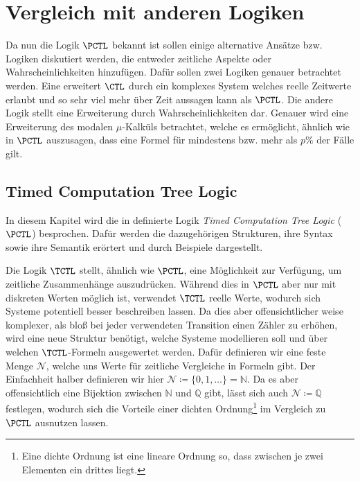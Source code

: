 \section{Vergleich mit anderen Logiken}
\label{ChapVerwandt}

Da nun die Logik $\PCTL$ bekannt ist sollen einige alternative Ansätze bzw. Logiken diskutiert werden, die entweder zeitliche Aspekte oder Wahrscheinlichkeiten hinzufügen.
Dafür sollen zwei Logiken genauer betrachtet werden.
Eine erweitert $\CTL$ durch ein komplexes System welches reelle Zeitwerte erlaubt und so sehr viel mehr über Zeit aussagen kann als $\PCTL$.
Die andere Logik stellt eine Erweiterung durch Wahrscheinlichkeiten dar.
Genauer wird eine Erweiterung des modalen $\mu$-Kalküls betrachtet, welche es ermöglicht, ähnlich wie in $\PCTL$ auszusagen, dass eine Formel für mindestens bzw. mehr als $p\%$ der Fälle gilt.

\subsection{Timed Computation Tree Logic}

In diesem Kapitel wird die in \cite{alur1990model} definierte Logik \textit{Timed Computation Tree Logic} ($\PCTL$) besprochen. Dafür werden die dazugehörigen Strukturen, ihre Syntax sowie ihre Semantik erörtert und durch Beispiele dargestellt.

Die Logik $\TCTL$ stellt, ähnlich wie $\PCTL$, eine Möglichkeit zur Verfügung, um zeitliche Zusammenhänge auszudrücken.
Während dies in $\PCTL$ aber nur mit diskreten Werten möglich ist, verwendet $\TCTL$ reelle Werte, wodurch sich Systeme potentiell besser beschreiben lassen.
Da dies aber offensichtlicher weise komplexer, als bloß bei jeder verwendeten Transition einen Zähler zu erhöhen, wird eine neue Struktur benötigt, welche Systeme modellieren soll und über welchen $\TCTL$-Formeln ausgewertet werden.
Dafür definieren wir eine feste Menge $\mathcal{N}$, welche uns Werte für zeitliche Vergleiche in Formeln gibt.
Der Einfachheit halber definieren wir hier $\mathcal{N}\coloneqq\{0,1,\dots\}=\mathbb{N}$.
Da es aber offensichtlich eine Bijektion zwischen $\mathbb{N}$ und $\mathbb{Q}$ gibt, lässt sich auch $\mathcal{N}\coloneqq\mathbb{Q}$ festlegen, wodurch sich die Vorteile einer dichten Ordnung\footnote{Eine dichte Ordnung ist eine lineare Ordnung so, dass zwischen je zwei Elementen ein drittes liegt.} im Vergleich zu $\PCTL$ ausnutzen lassen. \cite{alur1990model}

